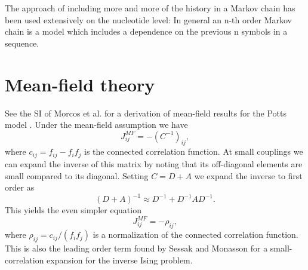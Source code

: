 \documentclass[superscriptaddress,onecolumn,pre]{revtex4}
\newcommand{\<}{\langle}
\renewcommand{\>}{\rangle}
\begin{document}
The approach of including more and more of the history in a Markov chain has been used extensively on the nucleotide level: In general an n-th order Markov chain is a model which includes a dependence on the previous n symbols in a sequence.

\section{Mean-field theory}

See the SI of Morcos et al. for a derivation of mean-field results for the Potts model \cite{Morcos2011}. Under the mean-field assumption we have 
\begin{equation}
    J_{ij}^{MF} = - (C^{-1})_{ij}, 
\end{equation}
where $c_{ij} = f_{ij} - f_i f_j$ is the connected correlation function. At small couplings we can expand the inverse of this matrix by noting that its off-diagonal elements are small compared to its diagonal. Setting $C = D + A$ we expand the inverse to first order as
\begin{equation}
    (D+A)^{-1} \approx D^{-1} + D^{-1} A D^{-1}. 
\end{equation}
This yields the even simpler equation
\begin{equation}
    J_{ij}^{MF} = - \rho_{ij},
\end{equation}
where $\rho_{ij} = c_{ij}/(f_i f_j)$ is a normalization of the connected correlation function. This is also the leading order term found by Sessak and Monasson for a small-correlation expansion for the inverse Ising problem.
\end{document}
